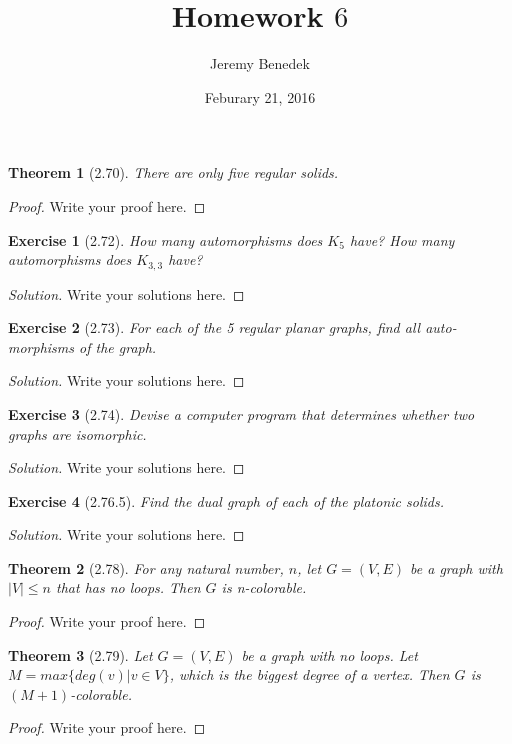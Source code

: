 \documentclass{article}
\title{Homework $6$}
\author{Jeremy Benedek}
\date{Feburary 21, 2016}
\newtheorem*{thm}{Theorem}
\newtheorem*{ex}{Exercise}
\newenvironment{solution}
  {\begin{proof}[Solution]}
  {\renewcommand{\qedsymbol}{}\end{proof}}
\begin{document}
\maketitle

\begin{thm}[2.70]
	There are only five regular solids.
\end{thm}
\begin{proof}
    Write your proof here.
\end{proof}

\begin{ex}[2.72]
	How many automorphisms does $K_5$ have? How many automorphisms does $K_{3,3}$ have?
\end{ex}
\begin{solution}
    Write your solutions here.
\end{solution}

\begin{ex}[2.73]
	For each of the 5 regular planar graphs, find all auto-morphisms of the graph.
\end{ex}
\begin{solution}
    Write your solutions here.
\end{solution}

\begin{ex}[2.74]
	Devise a computer program that determines whether two graphs are isomorphic.
\end{ex}
\begin{solution}
    Write your solutions here.
\end{solution}

\begin{ex}[2.76.5]
	Find the dual graph of each of the platonic solids.
\end{ex}
\begin{solution}
    Write your solutions here.
\end{solution}

\begin{thm}[2.78]
	For any natural number, $n$, let $G = (V,E)$ be a graph with $|V| \leq n$ that has no loops. Then $G$ is n-colorable. 
\end{thm}
\begin{proof}
    Write your proof here.
\end{proof}

\begin{thm}[2.79]
	Let $G = (V,E)$ be a graph with no loops. Let $M = max\{deg(v)|v\in V\}$, which is the biggest degree of a vertex. Then $G$ is $(M+1)$-colorable.
\end{thm}
\begin{proof}
    Write your proof here.
\end{proof}
\end{document}
